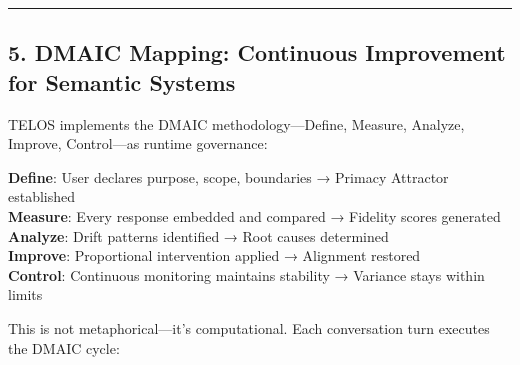 \begin{center}\rule{0.5\linewidth}{0.5pt}\end{center}

\subsection{5. DMAIC Mapping: Continuous Improvement for Semantic
Systems}\label{dmaic-mapping-continuous-improvement-for-semantic-systems}

TELOS implements the DMAIC methodology---Define, Measure, Analyze,
Improve, Control---as runtime governance:

\textbf{Define}: User declares purpose, scope, boundaries → Primacy
Attractor established\\
\textbf{Measure}: Every response embedded and compared → Fidelity scores
generated\\
\textbf{Analyze}: Drift patterns identified → Root causes determined\\
\textbf{Improve}: Proportional intervention applied → Alignment
restored\\
\textbf{Control}: Continuous monitoring maintains stability → Variance
stays within limits

This is not metaphorical---it's computational. Each conversation turn
executes the DMAIC cycle:

\begin{Shaded}
\begin{Highlighting}[]
\OperatorTok{=}
    
\OperatorTok{=}
\OperatorTok{=}
    
\OperatorTok{=}
\OperatorTok{=}
    
    \OperatorTok{\textgreater{}} \NormalTok{:}
\OperatorTok{=}
    
\end{Highlighting}
\end{Shaded}

